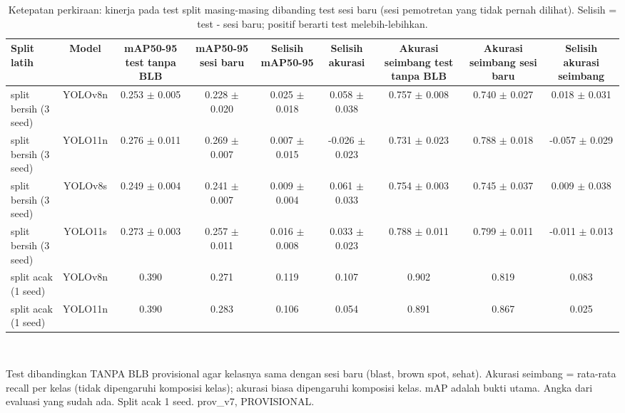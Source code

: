 \begin{table}[!t]
\centering
\caption{Ketepatan perkiraan: kinerja pada test split masing-masing dibanding test sesi baru (sesi pemotretan yang tidak pernah dilihat). Selisih = test - sesi baru; positif berarti test melebih-lebihkan.}
\label{tab:ketepatan_perkiraan}
\footnotesize
\begin{tabular}{lcccccccc}
\hline
\textbf{Split latih} & \textbf{Model} & \textbf{mAP50-95 test tanpa BLB} & \textbf{mAP50-95 sesi baru} & \textbf{Selisih mAP50-95} & \textbf{Selisih akurasi} & \textbf{Akurasi seimbang test tanpa BLB} & \textbf{Akurasi seimbang sesi baru} & \textbf{Selisih akurasi seimbang} \\
\hline
split bersih (3 seed) & YOLOv8n & 0.253 $\pm$ 0.005 & 0.228 $\pm$ 0.020 & 0.025 $\pm$ 0.018 & 0.058 $\pm$ 0.038 & 0.757 $\pm$ 0.008 & 0.740 $\pm$ 0.027 & 0.018 $\pm$ 0.031 \\
split bersih (3 seed) & YOLO11n & 0.276 $\pm$ 0.011 & 0.269 $\pm$ 0.007 & 0.007 $\pm$ 0.015 & -0.026 $\pm$ 0.023 & 0.731 $\pm$ 0.023 & 0.788 $\pm$ 0.018 & -0.057 $\pm$ 0.029 \\
split bersih (3 seed) & YOLOv8s & 0.249 $\pm$ 0.004 & 0.241 $\pm$ 0.007 & 0.009 $\pm$ 0.004 & 0.061 $\pm$ 0.033 & 0.754 $\pm$ 0.003 & 0.745 $\pm$ 0.037 & 0.009 $\pm$ 0.038 \\
split bersih (3 seed) & YOLO11s & 0.273 $\pm$ 0.003 & 0.257 $\pm$ 0.011 & 0.016 $\pm$ 0.008 & 0.033 $\pm$ 0.023 & 0.788 $\pm$ 0.011 & 0.799 $\pm$ 0.011 & -0.011 $\pm$ 0.013 \\
split acak (1 seed) & YOLOv8n & 0.390 & 0.271 & 0.119 & 0.107 & 0.902 & 0.819 & 0.083 \\
split acak (1 seed) & YOLO11n & 0.390 & 0.283 & 0.106 & 0.054 & 0.891 & 0.867 & 0.025 \\
\hline
\end{tabular}
\\[2pt]\parbox{\columnwidth}{\scriptsize Test dibandingkan TANPA BLB provisional agar kelasnya sama dengan sesi baru (blast, brown spot, sehat). Akurasi seimbang = rata-rata recall per kelas (tidak dipengaruhi komposisi kelas); akurasi biasa dipengaruhi komposisi kelas. mAP adalah bukti utama. Angka dari evaluasi yang sudah ada. Split acak 1 seed. prov\_v7, PROVISIONAL.}
\end{table}
